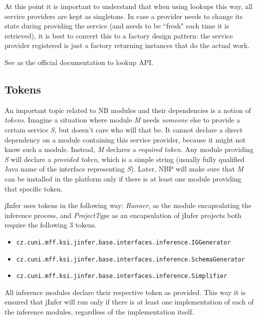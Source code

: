 \documentclass[a4paper,10pt,oneside]{article}
\newcommand{\code}[1]{\texttt{#1}}
\newcommand{\jmodule}[1]{\emph{#1}}
\begin{document}
At this point it is important to understand that when using lookups this way, all service providers are kept as singletons. In case a provider needs to change its state during providing the service (and needs to be ``fresh" each time it is retrieved), it is best to convert this to a factory design pattern: the service provider registered is just a factory returning instances that do the actual work.

See \cite{lookup_api} as the official documentation to lookup API.

\subsection{Tokens}
An important topic related to NB modules and their dependencies is a notion of \emph{tokens}. Imagine a situation where module \emph{M} needs \emph{someone} else to provide a certain service \emph{S}, but doesn't care who will that be. It cannot declare a direct dependency on a module containing this service provider, because it might not know such a module. Instead, \emph{M} declares a \emph{required token}. Any module providing \emph{S} will declare a \emph{provided token}, which is a simple string (usually fully qualified Java name of the interface representing \emph{S}). Later, NBP will make sure that \emph{M} can be installed in the platform only if there is at least one module providing that specific token.

jInfer uses tokens in the following way: \jmodule{Runner}, as the module encapsulating the inference process, and \jmodule{ProjectType} as an encapsulation of jInfer projects both require the following 3 tokens.
\begin{itemize}
	\item \code{cz.cuni.mff.ksi.jinfer.base.interfaces.inference.IGGenerator}
	\item \code{cz.cuni.mff.ksi.jinfer.base.interfaces.inference.SchemaGenerator}
	\item \code{cz.cuni.mff.ksi.jinfer.base.interfaces.inference.Simplifier}
\end{itemize}
All inference modules declare their respective token as provided. This way it is ensured that jInfer will run only if there is at least one implementation of each of the inference modules, regardless of the implementation itself.

\newpage


\end{document}

